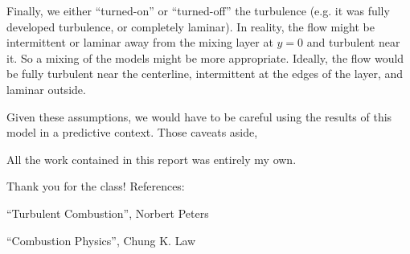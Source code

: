 \documentclass{article}
\begin{document}
Finally, we either ``turned-on'' or ``turned-off'' the turbulence
(e.g. it was fully developed turbulence, or completely laminar). In
reality, the flow might be intermittent or laminar away from the mixing
layer at $y=0$ and turbulent near it. So a mixing of the models might be
more appropriate. Ideally, the flow would be fully turbulent near the
centerline, intermittent at the edges of the layer, and laminar outside.  

Given these assumptions, we would have to be careful using the results of 
this model in a predictive context. Those caveats aside, 

\newpage
All the work contained in this report was entirely my own. 

Thank you for the class! 
\vspace{1in}
\newline
References:

``Turbulent Combustion'', Norbert Peters

``Combustion Physics'', Chung K. Law
\end{document}
